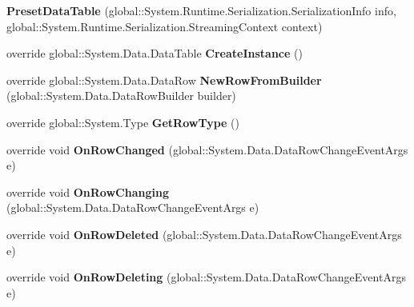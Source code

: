 \begin{DoxyCompactItemize}
\item 
{\bfseries Preset\+Data\+Table} (global\+::\+System.\+Runtime.\+Serialization.\+Serialization\+Info info, global\+::\+System.\+Runtime.\+Serialization.\+Streaming\+Context context)\hypertarget{class_products_1_1_data_1_1ds_sage_1_1_preset_data_table_a50d659e11648264a45325038f81154ee}{}\label{class_products_1_1_data_1_1ds_sage_1_1_preset_data_table_a50d659e11648264a45325038f81154ee}

\item 
override global\+::\+System.\+Data.\+Data\+Table {\bfseries Create\+Instance} ()\hypertarget{class_products_1_1_data_1_1ds_sage_1_1_preset_data_table_afdc8c9e8db96e789151539540361ff41}{}\label{class_products_1_1_data_1_1ds_sage_1_1_preset_data_table_afdc8c9e8db96e789151539540361ff41}

\item 
override global\+::\+System.\+Data.\+Data\+Row {\bfseries New\+Row\+From\+Builder} (global\+::\+System.\+Data.\+Data\+Row\+Builder builder)\hypertarget{class_products_1_1_data_1_1ds_sage_1_1_preset_data_table_a45950facff41af6009ab51dc2271e077}{}\label{class_products_1_1_data_1_1ds_sage_1_1_preset_data_table_a45950facff41af6009ab51dc2271e077}

\item 
override global\+::\+System.\+Type {\bfseries Get\+Row\+Type} ()\hypertarget{class_products_1_1_data_1_1ds_sage_1_1_preset_data_table_ac32b0870ebe2c994e6fec40bf6ba14f6}{}\label{class_products_1_1_data_1_1ds_sage_1_1_preset_data_table_ac32b0870ebe2c994e6fec40bf6ba14f6}

\item 
override void {\bfseries On\+Row\+Changed} (global\+::\+System.\+Data.\+Data\+Row\+Change\+Event\+Args e)\hypertarget{class_products_1_1_data_1_1ds_sage_1_1_preset_data_table_a5f42a4fd922cc7e69b769b3c61b90d4a}{}\label{class_products_1_1_data_1_1ds_sage_1_1_preset_data_table_a5f42a4fd922cc7e69b769b3c61b90d4a}

\item 
override void {\bfseries On\+Row\+Changing} (global\+::\+System.\+Data.\+Data\+Row\+Change\+Event\+Args e)\hypertarget{class_products_1_1_data_1_1ds_sage_1_1_preset_data_table_aaaebb7a0238b39d46c5e36a793a59687}{}\label{class_products_1_1_data_1_1ds_sage_1_1_preset_data_table_aaaebb7a0238b39d46c5e36a793a59687}

\item 
override void {\bfseries On\+Row\+Deleted} (global\+::\+System.\+Data.\+Data\+Row\+Change\+Event\+Args e)\hypertarget{class_products_1_1_data_1_1ds_sage_1_1_preset_data_table_a26349fe56c00194d5ad7866e37d79932}{}\label{class_products_1_1_data_1_1ds_sage_1_1_preset_data_table_a26349fe56c00194d5ad7866e37d79932}

\item 
override void {\bfseries On\+Row\+Deleting} (global\+::\+System.\+Data.\+Data\+Row\+Change\+Event\+Args e)\hypertarget{class_products_1_1_data_1_1ds_sage_1_1_preset_data_table_a6f66fd550d9a7204889974586a8f7d10}{}\label{class_products_1_1_data_1_1ds_sage_1_1_preset_data_table_a6f66fd550d9a7204889974586a8f7d10}

\end{DoxyCompactItemize}

